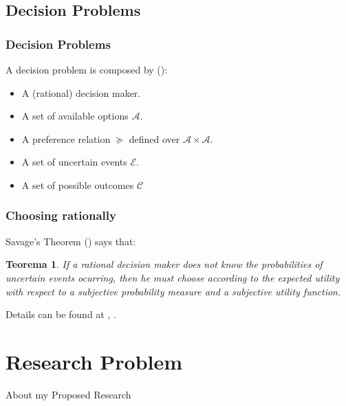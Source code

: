 \documentclass{beamer}
\theoremstyle{plain}
\newtheorem{teo}{Teorema}
\begin{document}
\subsection{Decision Problems}
	\begin{frame}
	\frametitle{Decision Problems}
	A decision problem is composed by (\cite{bernardo2000bayesian}):
	\begin{itemize}
	\item A (rational) decision maker.
	\item A set of available options $\mathcal{A}$.
	\item A preference relation $\succeq$ defined over $\mathcal{A} \times \mathcal{A}$.
	\item A set of uncertain events $\mathcal{E}$.
    \item A set of possible outcomes $\mathcal{C}$
	\end{itemize}
	\end{frame}
	
	\begin{frame}
	\frametitle{Choosing rationally}
	Savage's Theorem (\cite{savage1954the}) says that:
\begin{teo}	
	If a rational decision maker does not know the probabilities of uncertain events ocurring, then he must choose according to the expected utility with respect to a \textit{subjective} probability measure and a \textit{subjective} utility function.
\end{teo}
Details can be found at \cite{bernardo2000bayesian}, \cite{gilboa2009decision}.
	\end{frame}

\section{Research Problem}
\begin{frame}
About my Proposed Research
\end{frame}
\end{document}
